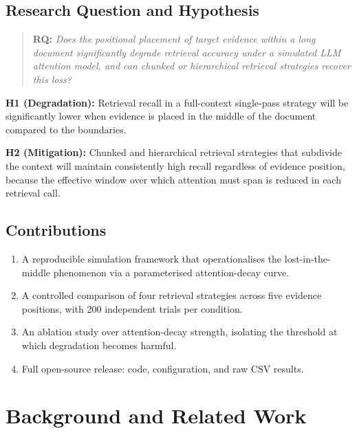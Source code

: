 \documentclass[sigconf,nonacm]{acmart}
\begin{document}
\subsection{Research Question and Hypothesis}
\label{sec:rq}

\begin{quote}
\textbf{RQ:} \emph{Does the positional placement of target evidence within a
long document significantly degrade retrieval accuracy under a simulated LLM
attention model, and can chunked or hierarchical retrieval strategies recover
this loss?}
\end{quote}

\noindent\textbf{H1 (Degradation):} Retrieval recall in a full-context single-pass
strategy will be significantly lower when evidence is placed in the middle of
the document compared to the boundaries.

\noindent\textbf{H2 (Mitigation):} Chunked and hierarchical retrieval strategies
that subdivide the context will maintain consistently high recall regardless of
evidence position, because the effective window over which attention must span
is reduced in each retrieval call.

\subsection{Contributions}

\begin{enumerate}
  \item A reproducible simulation framework that operationalises the
        lost-in-the-middle phenomenon via a parameterised attention-decay curve.
  \item A controlled comparison of four retrieval strategies across five
        evidence positions, with 200 independent trials per condition.
  \item An ablation study over attention-decay strength, isolating the
        threshold at which degradation becomes harmful.
  \item Full open-source release: code, configuration, and raw CSV results.
\end{enumerate}

\section{Background and Related Work}
\label{sec:background}
\end{document}
